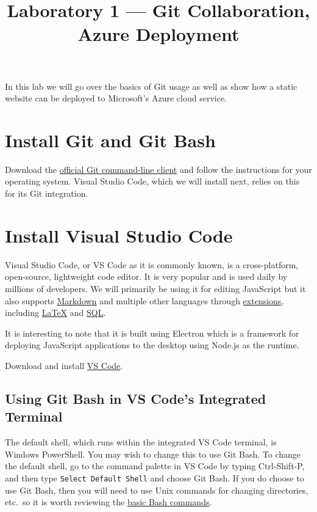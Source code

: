 \documentclass[11pt]{../sd3/ArcHandout}
\begin{document}
\title{Laboratory 1 --- Git Collaboration, Azure Deployment}
\makeheads


In this lab we will go over the basics of Git usage as well as show how a static website can be deployed to Microsoft's Azure cloud service.

\section{Install Git and Git Bash}

Download the \href{https://git-scm.com/downloads}{official Git command-line client} and follow the instructions for your operating system. Visual Studio Code, which we will install next, relies on this for its Git integration.

\section{Install Visual Studio Code} \label{sec:vscode}
Visual Studio Code, or VS Code as it is commonly known, is a cross-platform, open-source, lightweight code editor.
It is very popular and is used daily by millions of developers. We will primarily be using it for editing JavaScript but it also supports \href{https://code.visualstudio.com/docs/languages/markdown}{Markdown} and multiple other languages through \href{https://marketplace.visualstudio.com/vscode}{extensions}, including \href{https://marketplace.visualstudio.com/items?itemName=James-Yu.latex-workshop}{LaTeX} and \href{https://marketplace.visualstudio.com/search?term=sql&target=VSCode&category=All%20categories&sortBy=Relevance}{SQL}.

It is interesting to note that it is built using Electron which is a framework for deploying JavaScript applications to the desktop using Node.js as the runtime.

Download and install \href{https://code.visualstudio.com/}{VS Code}.


\subsection{Using Git Bash in VS Code's Integrated Terminal}
The default shell, which runs within the integrated VS Code terminal, is Windows PowerShell. You may wish to change this to use Git Bash. To change the default shell, go to the command palette in VS Code by typing Ctrl-Shift-P, and then type \texttt{Select Default Shell} and choose Git Bash. If you do choose to use Git Bash, then you will need to use Unix commands for changing directories, etc.\ so it is worth reviewing the \href{https://www.git-tower.com/learn/git/ebook/en/command-line/appendix/command-line-101}{basic Bash commands}.
\end{document}
